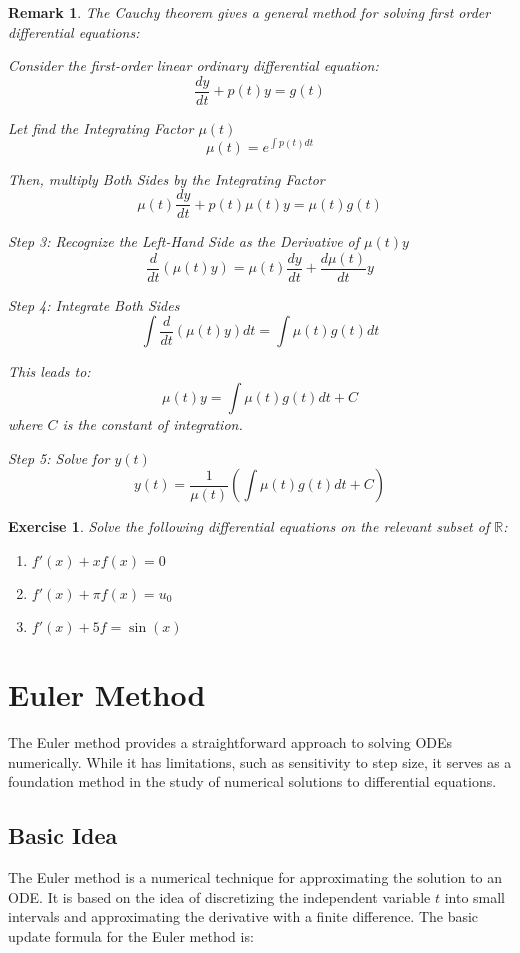\documentclass[french,12pt,a4paper]{book}
\newcommand{\R}{\mathbb{R}}
\newtheorem{exo}{Exercise}[chapter]
\newtheorem{rem}{Remark}[chapter]
\numberwithin{equation}{chapter}
\begin{document}
\begin{rem}
The Cauchy theorem gives a general method for solving first order differential equations:


Consider the first-order linear ordinary differential equation:
\[ \frac{dy}{dt} + p(t)y = g(t) \]

Let find the Integrating Factor \( \mu(t) \)
\[ \mu(t) = e^{\int p(t) dt} \]

Then, multiply Both Sides by the Integrating Factor
\[ \mu(t) \frac{dy}{dt} + p(t)\mu(t)y = \mu(t)g(t) \]

Step 3: Recognize the Left-Hand Side as the Derivative of \( \mu(t)y \)
\[ \frac{d}{dt}(\mu(t)y) = \mu(t)\frac{dy}{dt} + \frac{d\mu(t)}{dt}y \]

Step 4: Integrate Both Sides
\[ \int \frac{d}{dt}(\mu(t)y) dt = \int \mu(t)g(t) dt \]

This leads to:
\[ \mu(t)y = \int \mu(t)g(t) dt + C \]
where \( C \) is the constant of integration.

Step 5: Solve for \( y(t) \)
\[ y(t) = \frac{1}{\mu(t)} \left( \int \mu(t)g(t) dt + C \right) \]
\end{rem}

\begin{exo}
Solve the following differential equations on the relevant subset of $\R$:
\begin{enumerate}
\item $f'(x) + xf(x) = 0$
\item $f'(x) + \pi f(x) = u_0$
\item $f'(x) + 5f = \sin(x)$
\end{enumerate}
\end{exo}


\section{Euler Method}

The Euler method provides a straightforward approach to solving ODEs numerically. While it has limitations, such as sensitivity to step size, it serves as a foundation method in the study of numerical solutions to differential equations.

\subsection{Basic Idea}

The Euler method is a numerical technique for approximating the solution to an ODE. It is based on the idea of discretizing the independent variable \( t \) into small intervals and approximating the derivative with a finite difference. The basic update formula for the Euler method is:
\end{document}
